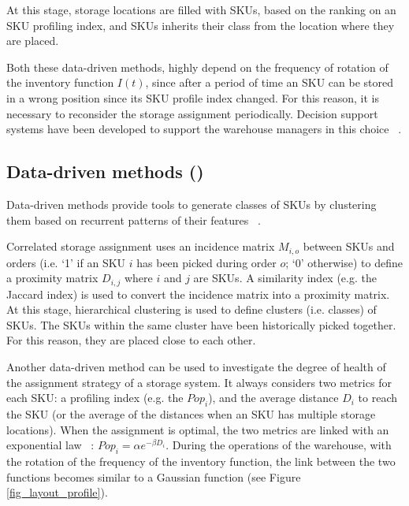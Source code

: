 At this stage, storage locations are filled with SKUs, based on the ranking on an SKU profiling index, and SKUs inherits their class from the location where they are placed. \par

Both these data-driven methods, highly depend on the frequency of rotation of the inventory function $I(t)$, since after a period of time an SKU can be stored in a wrong position since its SKU profile index changed. For this reason, it is necessary to reconsider the storage assignment periodically. Decision support systems have been developed to support the warehouse managers in this choice ~\cite{Accorsi2014}.

\subsection{Data-driven methods ()}

Data-driven methods provide tools to generate classes of SKUs by clustering them based on recurrent patterns of their features ~\cite{Bindi2009, Brynzer1996, Liu1999, Chiang2013, Moshref-Javadi2016, Pang2017, Smith2012, Xiao2012}.\par

Correlated storage assignment uses an incidence matrix $M_{i,o}$ between SKUs and orders (i.e. ‘1’ if an SKU $i$ has been picked during order $o$; ‘0’ otherwise) to define a proximity matrix $D_{i,j}$ where $i$ and $j$ are SKUs. A similarity index (e.g. the Jaccard index) is used to convert the incidence matrix into a proximity matrix. At this stage, hierarchical clustering is used to define clusters (i.e. classes) of SKUs. The SKUs within the same cluster have been historically picked together. For this reason, they are placed close to each other.\par

Another data-driven method can be used to investigate the degree of health of the assignment strategy of a storage system. It always considers two metrics for each SKU: a profiling index (e.g. the $Pop_i$), and the average distance $D_i$ to reach the SKU (or the average of the distances when an SKU has multiple storage locations). When the assignment is optimal, the two metrics are linked with an exponential law ~\cite{Manzini2018}: $Pop_i=\alpha e^{-\beta D_i}$. During the operations of the warehouse, with the rotation of the frequency of the inventory function, the link between the two functions becomes similar to a Gaussian function (see Figure \ref{fig_layout_profile}). \par

